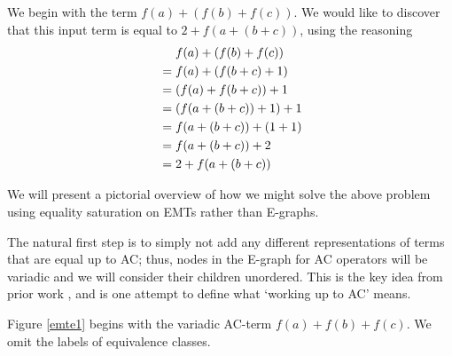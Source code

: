 \documentclass[12pt,a4paper,twoside,openright]{report}
\numberwithin{equation}{chapter}		%
\numberwithin{figure}{chapter}			%
\numberwithin{table}{chapter}			%
\theoremstyle{definition}
\theoremstyle{plain}
\begin{document}
We begin with the term $f(a) + (f(b) + f(c))$. We would like to discover that this input term is equal to $2 + f(a + (b + c))$, using the reasoning
\begin{align*}
	&\mathrel{\hphantom{=}} f(a) + (f(b) + f(c)) \\
	&= f(a) + (f(b + c) + 1) \\
	&= (f(a) + f(b + c)) + 1 \\
	&= (f(a + (b + c)) + 1) + 1 \\
	&= f(a + (b + c)) + (1 + 1) \\
	&= f(a + (b + c)) + 2 \\
	&= 2 + f(a + (b + c))
\end{align*}

We will present a pictorial overview of how we might solve the above problem using equality saturation on EMTs rather than E-graphs.

The natural first step is to simply not add any different representations of terms that are equal up to AC; thus, nodes in the E-graph for AC operators will be variadic and we will consider their children unordered. This is the key idea from prior work \citep{zucker_omelets_2025, panchekha_lin-graphs_2025, shanabrook_custom_2026}, and is one attempt to define what `working up to AC' means. 

Figure \ref{emte1} begins with the variadic AC-term $f(a) + f(b) + f(c)$.
We omit the labels of equivalence classes.
\end{document}
